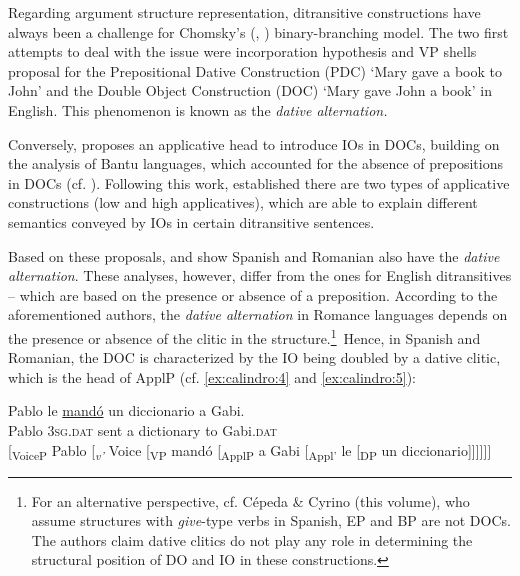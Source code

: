 \documentclass[output=paper,colorlinks,citecolor=brown]{./langscibook}
\begin{document}
Regarding argument structure representation, ditransitive constructions have always been a challenge for Chomsky’s (\citeyear{Chomsky1981}, \citeyear{Chomsky1986}) binary-branching model. The two first attempts to deal with the issue were  incorporation hypothesis and  VP shells proposal for the Prepositional Dative Construction (PDC) ‘Mary gave a book to John’ and the Double Object Construction (DOC) ‘Mary gave John a book’ in English. This phenomenon is known as the \textit{dative alternation.} 

Conversely, \citet{Marantz1993} proposes an applicative head to introduce IOs in DOCs, building on the analysis of Bantu languages, which accounted for the absence of prepositions in DOCs (cf. \citealt{AlsinaMchombo1993}). Following this work, \citet{Pylkkänen2002} established there are two types of applicative constructions (low and high applicatives), which are able to explain different semantics conveyed by IOs in certain ditransitive sentences. 

Based on these proposals, \citet{Cuervo2003} and \citet{DiaconescuRivero2007} show Spanish and Romanian also have the \textit{dative alternation}. These analyses, however, differ from the ones for English ditransitives – which are based on the presence or absence of a preposition. According to the aforementioned authors, the \textit{dative alternation} in Romance languages depends on the presence or absence of the clitic in the structure.\footnote{For an alternative perspective, cf. Cépeda \& Cyrino (this volume), who assume structures with \textit{give}-type verbs in Spanish, EP and BP are not DOCs. The authors claim dative clitics do not play any role in determining the structural position of DO and IO in these constructions.}~Hence, in Spanish and Romanian, the DOC is characterized by the IO being doubled by a dative clitic, which is the head of ApplP (cf. \ref{ex:calindro:4} and \ref{ex:calindro:5}):

\ea%
    \label{ex:calindro:4}
    \ea\label{ex:calindro:4a}
    \gll Pablo {le}               \underline{mandó} un diccionario  {a} {Gabi.} \\
    Pablo \textsc{3sg.dat}  sent      a dictionary     to Gabi.\textsc{dat}\\
    \ex\label{ex:calindro:4b} [\textsubscript{VoiceP} Pablo [\textit{\textsubscript{v’}} Voice [\textsubscript{VP} mandó [\textsubscript{ApplP} a Gabi [\textsubscript{Appl’} {le} [\textsubscript{DP} un diccionario]]]]]] \hfill \citep[35]{Cuervo2003}
    \z
\z
\end{document}
